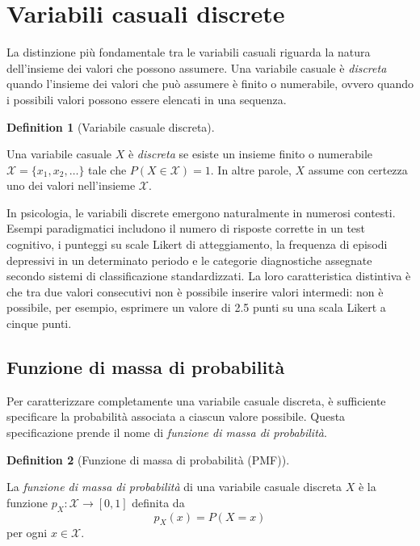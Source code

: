\documentclass[
  letterpaper,
  DIV=11,
  numbers=noendperiod,
  oneside]{scrreprt}
\theoremstyle{definition}
\theoremstyle{plain}
\theoremstyle{definition}
\newtheorem{definition}{Definition}[chapter]
\theoremstyle{remark}
\begin{document}
\section{Variabili casuali discrete}\label{variabili-casuali-discrete}

La distinzione più fondamentale tra le variabili casuali riguarda la
natura dell'insieme dei valori che possono assumere. Una variabile
casuale è \emph{discreta} quando l'insieme dei valori che può assumere è
finito o numerabile, ovvero quando i possibili valori possono essere
elencati in una sequenza.

\begin{definition}[Variabile casuale
discreta]\protect\hypertarget{def-discrete-rv}{}\label{def-discrete-rv}

Una variabile casuale \(X\) è \emph{discreta} se esiste un insieme
finito o numerabile \(\mathcal{X} = \{x_1, x_2, \ldots\}\) tale che
\(P(X \in \mathcal{X}) = 1\). In altre parole, \(X\) assume con certezza
uno dei valori nell'insieme \(\mathcal{X}\).

\end{definition}

In psicologia, le variabili discrete emergono naturalmente in numerosi
contesti. Esempi paradigmatici includono il numero di risposte corrette
in un test cognitivo, i punteggi su scale Likert di atteggiamento, la
frequenza di episodi depressivi in un determinato periodo e le categorie
diagnostiche assegnate secondo sistemi di classificazione
standardizzati. La loro caratteristica distintiva è che tra due valori
consecutivi non è possibile inserire valori intermedi: non è possibile,
per esempio, esprimere un valore di 2.5 punti su una scala Likert a
cinque punti.

\subsection{Funzione di massa di
probabilità}\label{funzione-di-massa-di-probabilituxe0}

Per caratterizzare completamente una variabile casuale discreta, è
sufficiente specificare la probabilità associata a ciascun valore
possibile. Questa specificazione prende il nome di \emph{funzione di
massa di probabilità}.

\begin{definition}[Funzione di massa di probabilità
(PMF)]\protect\hypertarget{def-pmf}{}\label{def-pmf}

La \emph{funzione di massa di probabilità} di una variabile casuale
discreta \(X\) è la funzione \(p_X : \mathcal{X} \to [0,1]\) definita da
\[
p_X(x) = P(X = x)
\] per ogni \(x \in \mathcal{X}\).

\end{definition}
\end{document}

